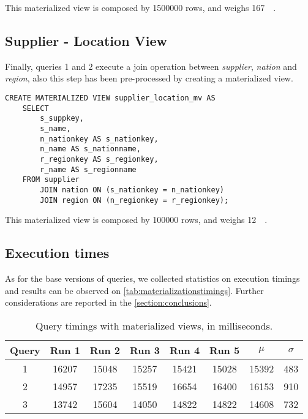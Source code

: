 This materialized view is composed by \num{1500000} rows, and weighs \SI{167}{\mega\byte}.

\subsection{Supplier - Location View}
Finally, queries 1 and 2 execute a join operation between \textit{supplier}, \textit{nation} and \textit{region}, also this step has been pre-processed by creating a materialized view.

\begin{lstlisting}
CREATE MATERIALIZED VIEW supplier_location_mv AS
	SELECT 
		s_suppkey, 
		s_name, 
		n_nationkey AS s_nationkey, 
		n_name AS s_nationname, 
		r_regionkey AS s_regionkey, 
		r_name AS s_regionname 
	FROM supplier 
		JOIN nation ON (s_nationkey = n_nationkey)
		JOIN region ON (n_regionkey = r_regionkey);
\end{lstlisting}

This materialized view is composed by \num{100000} rows, and weighs \SI{12}{\mega\byte}.

\subsection{Execution times}

As for the base versions of queries, we collected statistics on execution timings and results can be observed on \autoref{tab:materializationstimings}. Further considerations are reported in the \autoref{section:conclusions}.

\begin{table}[!h]
\centering
\begin{tabular}{|| c | c c c c c | c c ||} 
 \hline
 Query & Run 1 & Run 2 & Run 3 & Run 4 & Run 5 & 	$\mu$ & $\sigma$ \\ [0.5ex] 
 \hline\hline
 1 & \num{16207} & \num{15048} & \num{15257} & \num{15421} & \num{15028} & \num{15392} & \num{483} \\ 
 \hline
 2 & \num{14957} & \num{17235} & \num{15519} & \num{16654} & \num{16400} & \num{16153} & \num{910} \\ 
 \hline
 3 & \num{13742} & \num{15604} & \num{14050} & \num{14822} & \num{14822} & \num{14608} & \num{732} \\ 
 \hline
\end{tabular}
  \caption{Query timings with materialized views, in milliseconds.}
  \label{tab:materializationstimings}
\end{table}